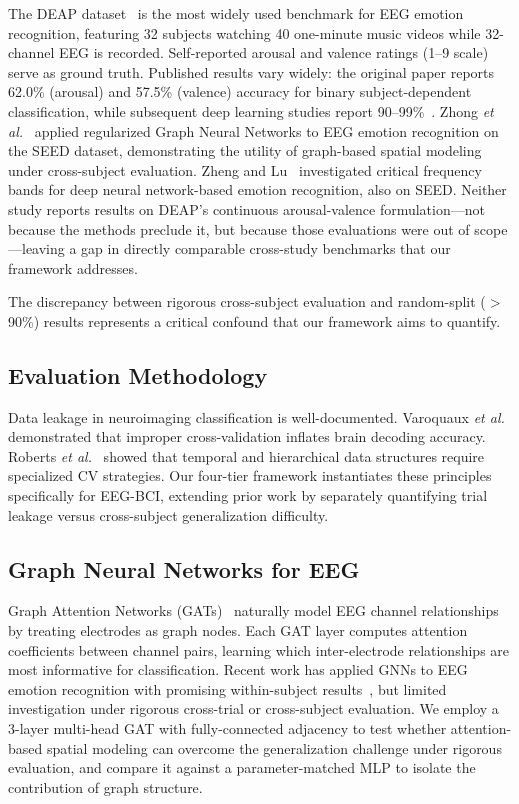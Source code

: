 \documentclass[a4paper, 10pt, conference]{ieeeconf}
\begin{document}
The DEAP dataset~\cite{koelstra2012} is the most widely used benchmark for EEG emotion recognition, featuring 32 subjects watching 40 one-minute music videos while 32-channel EEG is recorded. Self-reported arousal and valence ratings (1--9 scale) serve as ground truth. Published results vary widely: the original paper reports 62.0\% (arousal) and 57.5\% (valence) accuracy for binary subject-dependent classification, while subsequent deep learning studies report 90--99\%~\cite{craik2019}. Zhong \textit{et al.}~\cite{zhong2020} applied regularized Graph Neural Networks to EEG emotion recognition on the SEED dataset, demonstrating the utility of graph-based spatial modeling under cross-subject evaluation. Zheng and Lu~\cite{zheng2015} investigated critical frequency bands for deep neural network-based emotion recognition, also on SEED. Neither study reports results on DEAP's continuous arousal-valence formulation---not because the methods preclude it, but because those evaluations were out of scope---leaving a gap in directly comparable cross-study benchmarks that our framework addresses.

The discrepancy between rigorous cross-subject evaluation and random-split ($>$90\%) results represents a critical confound that our framework aims to quantify.

\subsection{Evaluation Methodology}

Data leakage in neuroimaging classification is well-documented. Varoquaux \textit{et al.}~\cite{varoquaux2017} demonstrated that improper cross-validation inflates brain decoding accuracy. Roberts \textit{et al.}~\cite{roberts2017} showed that temporal and hierarchical data structures require specialized CV strategies. Our four-tier framework instantiates these principles specifically for EEG-BCI, extending prior work by separately quantifying trial leakage versus cross-subject generalization difficulty.

\subsection{Graph Neural Networks for EEG}

Graph Attention Networks (GATs)~\cite{velickovic2018} naturally model EEG channel relationships by treating electrodes as graph nodes. Each GAT layer computes attention coefficients between channel pairs, learning which inter-electrode relationships are most informative for classification. Recent work has applied GNNs to EEG emotion recognition with promising within-subject results~\cite{zhong2020}, but limited investigation under rigorous cross-trial or cross-subject evaluation. We employ a 3-layer multi-head GAT with fully-connected adjacency to test whether attention-based spatial modeling can overcome the generalization challenge under rigorous evaluation, and compare it against a parameter-matched MLP to isolate the contribution of graph structure.
\end{document}
